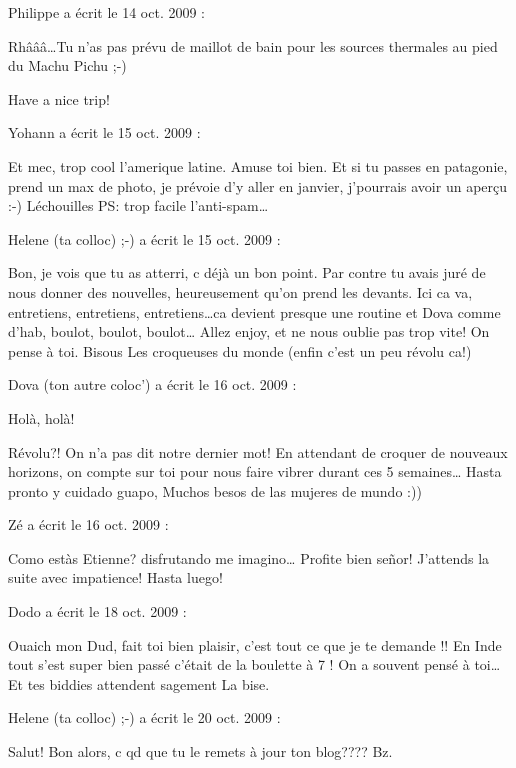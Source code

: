 \medskip
Philippe a écrit le 14 oct. 2009 :
\begin{displayquote}
Rhâââ\dots Tu n'as pas prévu de maillot de bain pour les sources thermales au pied du Machu Pichu ;-)

Have a nice trip!
\end{displayquote}

\medskip
Yohann a écrit le 15 oct. 2009 :
\begin{displayquote}
Et mec, trop cool l'amerique latine. Amuse toi bien. Et si tu passes en patagonie, prend un max de photo, je prévoie d'y aller en janvier, j'pourrais avoir un aperçu :-)
Léchouilles
PS: trop facile l'anti-spam\dots
\end{displayquote}

\medskip
Helene (ta colloc) ;-) a écrit le 15 oct. 2009 :
\begin{displayquote}
Bon, je vois que tu as atterri, c déjà un bon point.
Par contre tu avais juré de nous donner des nouvelles, heureusement qu'on prend les devants.
Ici ca va, entretiens, entretiens, entretiens\dots ca devient presque une routine et Dova comme d'hab, boulot, boulot, boulot\dots
Allez enjoy, et ne nous oublie pas trop vite!
On pense à toi.
Bisous
Les croqueuses du monde (enfin c'est un peu révolu ca!)
\end{displayquote}

\medskip
Dova (ton autre coloc') a écrit le 16 oct. 2009 :
\begin{displayquote}
Holà, holà!

Révolu?! On n'a pas dit notre dernier mot!
En attendant de croquer de nouveaux horizons, on compte sur toi pour nous faire vibrer durant ces 5 semaines\dots
Hasta pronto y cuidado guapo,
Muchos besos de las mujeres de mundo :))
\end{displayquote}

\medskip
Zé a écrit le 16 oct. 2009 :
\begin{displayquote}
Como estàs Etienne? disfrutando me imagino\dots
Profite bien señor! J'attends la suite avec impatience!
Hasta luego!
\end{displayquote}

\medskip
Dodo a écrit le 18 oct. 2009 :
\begin{displayquote}
Ouaich mon Dud, fait toi bien plaisir, c'est tout ce que je te demande !! En Inde tout s'est super bien passé c'était de la boulette à 7 ! On a souvent pensé à toi\dots Et tes biddies attendent sagement
La bise.
\end{displayquote}

\medskip
Helene (ta colloc) ;-) a écrit le 20 oct. 2009 :
\begin{displayquote}
Salut!
Bon alors, c qd que tu le remets à jour ton blog????
Bz.
\end{displayquote}

\vfill
